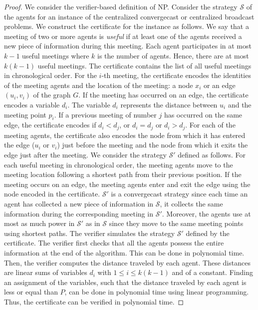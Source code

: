 \documentclass{article}
\newcommand{\cA}{\ensuremath{\mathcal{S}\xspace}}
\newcommand\strat{\mbox{strategy}\xspace}
\newcommand\ccast{convergecast\xspace}
\newcommand\cccast{centralized convergecast\xspace}
\begin{document}
\begin{proof}
We consider the verifier-based definition of NP. Consider the {\strat} $\cA$ of the agents for an instance of the {\cccast} or centralized broadcast problems. We construct the certificate for the instance as follows. We say that a meeting of two or more agents is \emph{useful} if at least one of the agents received a new piece of information during this meeting. Each agent participates in at most $k-1$ useful meetings where $k$ is the number of agents. Hence, there are at most $k(k-1)$ useful meetings. The certificate contains the list of all useful meetings in chronological order. For the $i$-th meeting, the certificate encodes the identities of the meeting agents and the location of the meeting: a node $x_i$  or an edge $(u_i,v_i)$ of the graph $G$. If the meeting has occurred on an edge, the certificate encodes a variable $d_i$. The variable  $d_i$ represents the distance between $u_i$ and the meeting point $p_i$. If a previous meeting of number $j$ has occurred on the same edge, the certificate encodes if $d_i<d_j$, or $d_i=d_j$ or $d_i>d_j$. For each of the meeting agents, the certificate also encodes the node from which it has entered the edge ($u_i$ or $v_i$) just before the meeting and the node from which it exits the edge just after the meeting. We consider the {\strat} $\cA'$ defined as follows. For each useful meeting in chronological order, the meeting agents move to the meeting location following a shortest path from their previous position. If the meeting occurs on an edge, the meeting agents enter and exit the edge using the node encoded in the certificate. $\cA'$ is a {\ccast} {\strat} since each time an agent has collected a new piece of information in $\cA$, it collects the same information during the corresponding meeting in $\cA'$. Moreover, the agents use at most as much power in $\cA'$ as in $\cA$ since they move to the same meeting points using shortest paths. The verifier simulates the {\strat} $\cA'$ defined by the certificate. The verifier first checks that all the agents possess the entire information at the end of the algorithm. This can be done in polynomial time. Then, the verifier computes the distance traveled by each agent. These distances are linear sums of variables $d_i$ with $1\leq i \leq k(k-1)$ and of a constant. Finding an assignment of the variables, such that the distance traveled by each agent is less or equal than $P$, can be done in polynomial time using linear programming. Thus, the certificate can be verified in polynomial time.
\end{proof}
\end{document}

